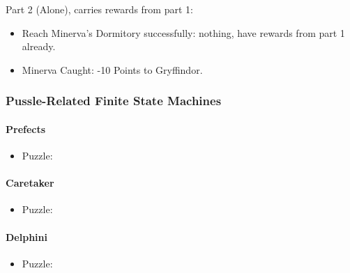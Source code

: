 Part 2 (Alone), carries rewards from part 1:

\begin{itemize}
	\item Reach Minerva's Dormitory successfully: nothing, have rewards from part 1 already.
	\item Minerva Caught: -10 Points to Gryffindor.
\end{itemize}

\subsubsection{Pussle-Related Finite State Machines}

\paragraph{Prefects}
\begin{itemize}
\item Puzzle: 
\end{itemize}
\pagebreak

\paragraph{Caretaker}
\begin{itemize}
\item Puzzle: 
\end{itemize}
\pagebreak

\paragraph{Delphini}
\begin{itemize}
\item Puzzle: 
\end{itemize}
\pagebreak